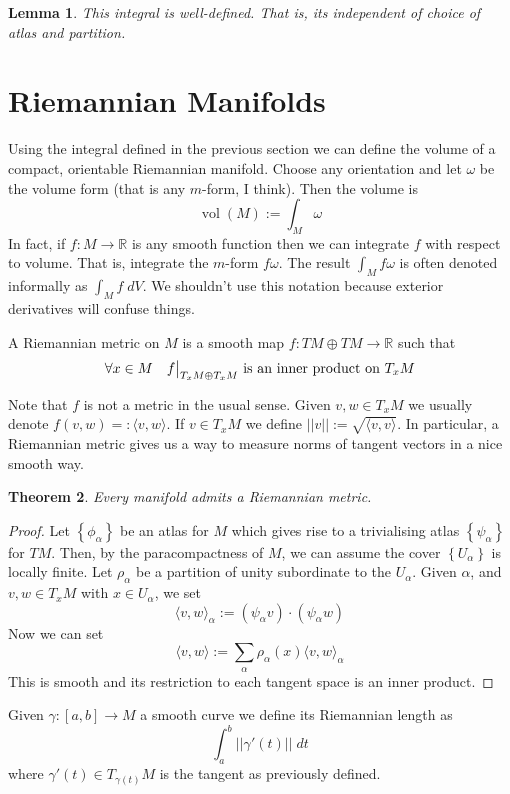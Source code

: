 \documentclass[11pt]{article}
\newcommand{\defeq}{:=}
\newcommand{\eqdef}{=:}
\newcommand{\norm}[1]{||#1||}
\DeclareMathOperator{\vol}{\mathrm{vol}}
\newcommand\restr[2]{{%
  \left.\kern-\nulldelimiterspace %
  #1 %
  \vphantom{\big|} %
  \right|_{#2} %
  }}
\newcommand{\R}{\mathbb{R}}
\newenvironment{defin}
	{\begin{mdframed}[backgroundcolor=white, roundcorner=5pt, linewidth=1pt, linecolor=RoyalBlue]
		\setlength{\parindent}{0pt}}
	{\end{mdframed}}
\newcommand{\mdf}[1]{{\color{RoyalBlue} #1}}
\newtheorem{theorem}{Theorem}[section]
\newtheorem{lemma}[theorem]{Lemma}
\begin{document}
\begin{lemma}
This integral is well-defined.
That is, its independent of choice of atlas and partition.
\end{lemma}

\section{Riemannian Manifolds}
Using the integral defined in the previous section we can define the volume of a compact, orientable Riemannian manifold.
Choose any orientation and let $\omega$ be the volume form (that is any $m$-form, I think).
Then the volume is
\[
	\vol(M)\defeq\int_M \omega
\]
In fact, if $f:M \to \R$ is any smooth function then we can integrate $f$ with respect to volume.
That is, integrate the $m$-form $f\omega$.
The result $\int_M f\omega$ is often denoted informally as $\int_M f \; dV$.
We shouldn't use this notation because exterior derivatives will confuse things.

\begin{defin}
A \mdf{Riemannian metric} on $M$ is a smooth map $f: TM \oplus TM \to \R$ such that
\[
	\forall x \in M \quad \restr{f}{T_xM\oplus T_xM}\text{ is an inner product on }T_xM
\]
\end{defin}
Note that $f$ is not a metric in the usual sense.
Given $v, w\in T_xM$ we usually denote $f(v, w)\eqdef \langle v, w\rangle$.
If $v\in T_x M$ we define $\norm{v}\defeq \sqrt{\langle v, v\rangle}$.
In particular, a Riemannian metric gives us a way to measure norms of tangent vectors in a nice smooth way.

\begin{theorem}
Every manifold admits a Riemannian metric.
\end{theorem}

\begin{proof}
Let $\left\{ \phi_\alpha\right\}$ be an atlas for $M$ which gives rise to a trivialising atlas $\left\{ \psi_\alpha\right\}$ for $TM$.
Then, by the paracompactness of $M$, we can assume the cover $\left\{ U_\alpha\right\}$ is locally finite.
Let $\rho_\alpha$ be a partition of unity subordinate to the $U_\alpha$.
Given $\alpha$, and $v, w\in T_xM$ with $x\in U_\alpha$, we set
\[
	\langle v, w\rangle_\alpha \defeq (\psi_\alpha v)\cdot (\psi_\alpha w)
\]
Now we can set
\[
	\langle v, w\rangle\defeq\sum_{\alpha}\rho_\alpha(x) \langle v, w\rangle_\alpha
\]
This is smooth and its restriction to each tangent space is an inner product.
\end{proof}

\begin{defin}
	Given $\gamma:[a, b]\to M$ a smooth curve we define its \mdf{Riemannian length} as
	\[
		\int_a^b \norm{\gamma'(t)}\; dt
	\]
	where $\gamma'(t) \in T_{\gamma(t)}M$ is the tangent as previously defined.
\end{defin}
\end{document}
